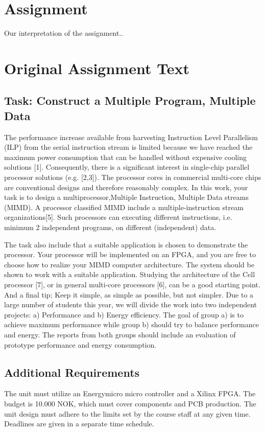 \section{Assignment}

Our interpretation of the assignment..

\section{Original Assignment Text}

\subsection{Task: Construct a Multiple Program, Multiple Data}
The performance increase available from harvesting Instruction Level Parallelism (ILP) from the serial 
instruction stream is limited because we have reached the maximum power consumption that can be 
handled without expensive cooling solutions [1]. Consequently, there is a significant interest in 
single-chip parallel processor solutions (e.g. [2,3]). The processor cores in commercial multi-core 
chips are conventional designs and therefore reasonably complex. In this work, your task is to design 
a multiprocessor,Multiple Instruction, Multiple Data streams (MIMD). A processor classified MIMD 
include a multiple-instruction stream organizations[5]. Such processors can executing different 
instructions, i.e. minimum 2 independent programs, on different (independent) data. 
 
The task also include that a suitable application is chosen to demonstrate the processor. 
Your processor will be implemented on an FPGA, and you are free to choose how to realize your  
MIMD  computer  architecture.  The system should  be shown to work with  a suitable  application. 
Studying the architecture of the Cell processor [7], or in general multi-core processors [6], can be a 
good starting point. And a final tip; Keep it simple, as simple as possible, but not simpler. 
Due to a large number of students this year, we will divide the work into two independent projects: 
a) Performance and b) Energy efficiency. The goal of group a) is to achieve maximum performance 
while group b) should try to balance performance and energy. The reports from both groups should 
include an evaluation of prototype performance and energy consumption. 

\subsection{Additional Requirements}
The unit must utilize an Energymicro micro controller and a Xilinx FPGA. The budget is 10.000 NOK, 
which must cover components and PCB production. The unit design must adhere to the limits set by 
the course staff at any given time. Deadlines are given in a separate time schedule.

